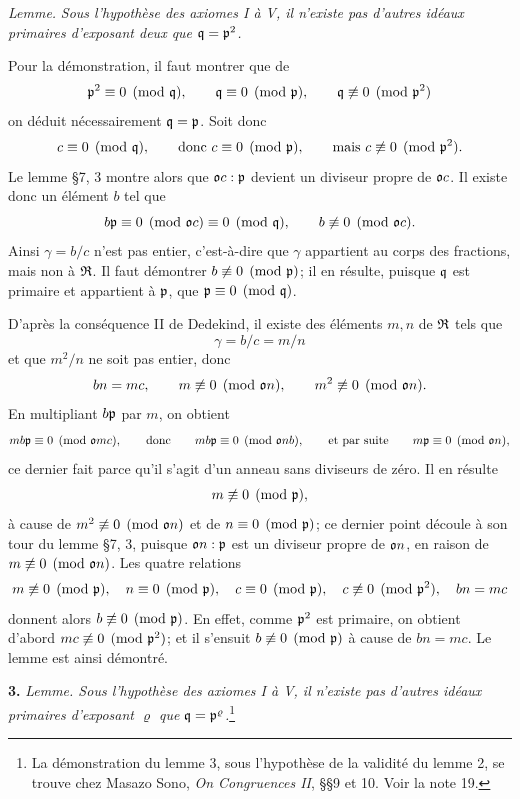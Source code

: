 \emph{Lemme.} \emph{Sous l'hypothèse des axiomes I à V, il n'existe pas d'autres idéaux primaires d'exposant deux que $\mathfrak{q}=\mathfrak{p}^2$.}

Pour la démonstration, il faut montrer que de
\[
        \mathfrak{p}^2\equiv0\pmod{\mathfrak{q}},
        \qquad \mathfrak{q}\equiv0\pmod{\mathfrak{p}},
        \qquad \mathfrak{q}\not\equiv0\pmod{\mathfrak{p}^2}
\]
on déduit nécessairement $\mathfrak{q}=\mathfrak{p}$. Soit donc
\[
        c\equiv0\pmod{\mathfrak{q}},
        \qquad\text{donc }c\equiv0\pmod{\mathfrak{p}},
        \qquad\text{mais }c\not\equiv0\pmod{\mathfrak{p}^2}.
\]
Le lemme \S{}7, 3 montre alors que $\mathfrak{o} c:\mathfrak{p}$ devient un diviseur propre de $\mathfrak{o} c$. Il existe donc un élément $b$ tel que
\[
        b\mathfrak{p}\equiv0\pmod{\mathfrak{o} c}\equiv0\pmod{\mathfrak{q}},
        \qquad b\not\equiv0\pmod{\mathfrak{o} c}.
\]
Ainsi $\gamma=b/c$ n'est pas entier, c'est-à-dire que $\gamma$ appartient au corps des fractions, mais non à $\mathfrak{R}$. Il faut démontrer $b\not\equiv0\pmod{\mathfrak{p}}$; il en résulte, puisque $\mathfrak{q}$ est primaire et appartient à $\mathfrak{p}$, que $\mathfrak{p}\equiv0\pmod{\mathfrak{q}}$.

D'après la conséquence II de Dedekind, il existe des éléments $m,n$ de $\mathfrak{R}$ tels que
\[
        \gamma=b/c=m/n
\]
et que $m^2/n$ ne soit pas entier, donc
\[
        bn=mc,
        \qquad m\not\equiv0\pmod{\mathfrak{o} n},
        \qquad m^2\not\equiv0\pmod{\mathfrak{o} n}.
\]
En multipliant $b\mathfrak{p}$ par $m$, on obtient
\[
        mb\mathfrak{p}\equiv0\pmod{\mathfrak{o} mc},
        \qquad\text{donc}\qquad mb\mathfrak{p}\equiv0\pmod{\mathfrak{o} nb},
        \qquad\text{et par suite}\qquad m\mathfrak{p}\equiv0\pmod{\mathfrak{o} n},
\]
ce dernier fait parce qu'il s'agit d'un anneau sans diviseurs de zéro. Il en résulte
\[
        m\not\equiv0\pmod{\mathfrak{p}},
\]
à cause de $m^2\not\equiv0\pmod{\mathfrak{o} n}$ et de $n\equiv0\pmod{\mathfrak{p}}$; ce dernier point découle à son tour du lemme \S{}7, 3, puisque $\mathfrak{o} n:\mathfrak{p}$ est un diviseur propre de $\mathfrak{o} n$, en raison de $m\not\equiv0\pmod{\mathfrak{o} n}$. Les quatre relations
\[
        m\not\equiv0\pmod{\mathfrak{p}},
        \quad n\equiv0\pmod{\mathfrak{p}},
        \quad c\equiv0\pmod{\mathfrak{p}},
        \quad c\not\equiv0\pmod{\mathfrak{p}^2},
        \quad bn=mc
\]
donnent alors $b\not\equiv0\pmod{\mathfrak{p}}$. En effet, comme $\mathfrak{p}^2$ est primaire, on obtient d'abord $mc\not\equiv0\pmod{\mathfrak{p}^2}$; et il s'ensuit $b\not\equiv0\pmod{\mathfrak{p}}$ à cause de $bn=mc$. Le lemme est ainsi démontré.

\textbf{3.} \emph{Lemme. Sous l'hypothèse des axiomes I à V, il n'existe pas d'autres idéaux primaires d'exposant $\varrho$ que $\mathfrak{q}=\mathfrak{p}^\varrho$.}\footnote{La démonstration du lemme 3, sous l'hypothèse de la validité du lemme 2, se trouve chez Masazo Sono, \emph{On Congruences II}, \S{}\S{}9 et 10. Voir la note 19.}

